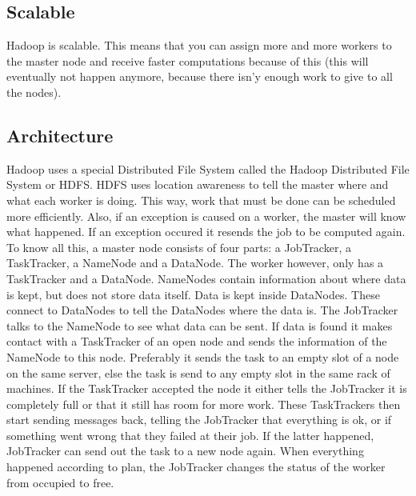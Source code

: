 \documentclass[a4paper]{article}
\begin{document}
  \subsection{Scalable}
    Hadoop is scalable. This means that you can assign more and more workers
    to the master node and receive faster computations because of this
    (this will eventually not happen anymore, because there isn'y enough work to give to all the nodes).
    
  \subsection{Architecture}
    Hadoop uses a special Distributed File System called the Hadoop
    Distributed File System or HDFS. HDFS uses location awareness to tell
    the master where and what each worker is doing. This way, work that must
    be done can be scheduled more efficiently. Also, if an exception is caused
    on a worker, the master will know what happened. If an exception occured
    it resends the job to be computed again.\\
    To know all this, a master node consists of four parts: a JobTracker,
    a TaskTracker, a NameNode and a DataNode. The worker however, only has a
    TaskTracker and a DataNode.
    NameNodes contain information about where data is kept, but does not store
    data itself. Data is kept inside DataNodes. These connect to DataNodes to
    tell the DataNodes where the data is. The JobTracker talks to the NameNode
    to see what data can be sent. If data is found it makes contact with a
    TaskTracker of an open node and sends the information of the NameNode
    to this node. Preferably it sends the task to an empty slot of a node
    on the same server, else the task is send to any empty slot in the same
    rack of machines. If the TaskTracker accepted the node it either tells
    the JobTracker it is completely full or that it still has room for more
    work. These TaskTrackers then start sending messages back, telling the
    JobTracker that everything is ok, or if something went wrong that they
    failed at their job. If the latter happened, JobTracker can send out
    the task to a new node again. When everything happened according to plan,
    the JobTracker changes the status of the worker from occupied to free.
    
\end{document}
